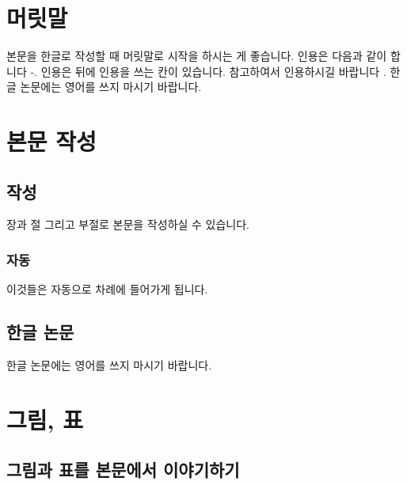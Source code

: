 \documentclass[doctor,korean,final]{kmu}
\begin{document}
\tableofcontents

\listoftables

\listoffigures


\chapter{머릿말}
본문을 한글로 작성할 때 머릿말로 시작을 하시는 게 좋습니다. \cite{FD1}
인용은 다음과 같이 합니다 \cite{RVP1}-\cite{ML2}.
인용은 뒤에 인용을 쓰는 칸이 있습니다. 참고하여서 인용하시길 바랍니다 \cite{SOCA2,EF2}.
한글 논문에는 영어를 쓰지 마시기 바랍니다. 


\chapter{본문 작성}

\section{작성}

장과 절 그리고 부절로 본문을 작성하실 수 있습니다.

\subsection{자동}

이것들은 자동으로 차례에 들어가게 됩니다.

\section{한글 논문}

한글 논문에는 영어를 쓰지 마시기 바랍니다.

\chapter{그림, 표}

\section{그림과 표를 본문에서 이야기하기}
\end{document}
